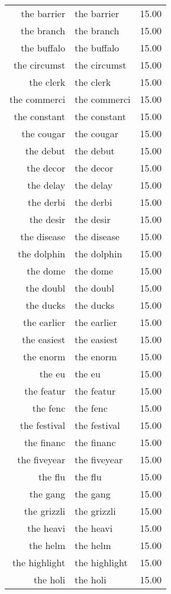 \begin{table}[ht]
\begin{tabular}{rlr}
  the barrier & the barrier & 15.00 \\ 
  the branch & the branch & 15.00 \\ 
  the buffalo & the buffalo & 15.00 \\ 
  the circumst & the circumst & 15.00 \\ 
  the clerk & the clerk & 15.00 \\ 
  the commerci & the commerci & 15.00 \\ 
  the constant & the constant & 15.00 \\ 
  the cougar & the cougar & 15.00 \\ 
  the debut & the debut & 15.00 \\ 
  the decor & the decor & 15.00 \\ 
  the delay & the delay & 15.00 \\ 
  the derbi & the derbi & 15.00 \\ 
  the desir & the desir & 15.00 \\ 
  the disease & the disease & 15.00 \\ 
  the dolphin & the dolphin & 15.00 \\ 
  the dome & the dome & 15.00 \\ 
  the doubl & the doubl & 15.00 \\ 
  the ducks & the ducks & 15.00 \\ 
  the earlier & the earlier & 15.00 \\ 
  the easiest & the easiest & 15.00 \\ 
  the enorm & the enorm & 15.00 \\ 
  the eu & the eu & 15.00 \\ 
  the featur & the featur & 15.00 \\ 
  the fenc & the fenc & 15.00 \\ 
  the festival & the festival & 15.00 \\ 
  the financ & the financ & 15.00 \\ 
  the fiveyear & the fiveyear & 15.00 \\ 
  the flu & the flu & 15.00 \\ 
  the gang & the gang & 15.00 \\ 
  the grizzli & the grizzli & 15.00 \\ 
  the heavi & the heavi & 15.00 \\ 
  the helm & the helm & 15.00 \\ 
  the highlight & the highlight & 15.00 \\ 
  the holi & the holi & 15.00 \\ 

\end{tabular}
\end{table}
